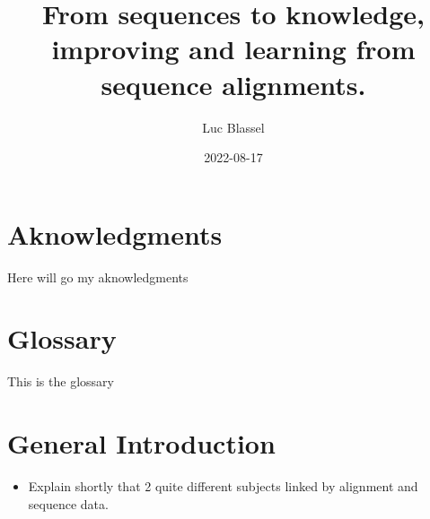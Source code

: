 \documentclass[
  11pt,
  twoside]{scrbook}
\title{From sequences to knowledge, improving and learning from sequence alignments.}
\author{Luc Blassel}
\date{2022-08-17}
\providecommand{\tightlist}{%
  \setlength{\itemsep}{0pt}\setlength{\parskip}{0pt}}
\begin{document}
\maketitle




\pagestyle{empty}
\frontmatter

\chapter{Aknowledgments}
Here will go my aknowledgments
\lipsum[7-9]

\chapter{Glossary}
This is the glossary

\mainmatter

{
\setcounter{tocdepth}{2}
\tableofcontents
}
\listoffigures
\listoftables
\pagestyle{empty}

\pagestyle{fancy}
\fancyhf{}
\fancyhead[RO]{\rightmark}
\fancyfoot[CO,CE]{\thepage}

\hypertarget{general-introduction}{%
\chapter*{General Introduction}\label{general-introduction}}

\begin{itemize}
\tightlist
\item
  Explain shortly that 2 quite different subjects linked by alignment and sequence data.
\end{itemize}
\end{document}
